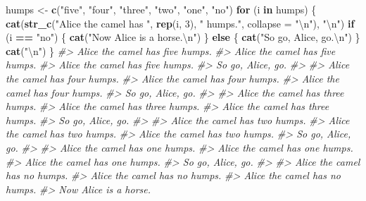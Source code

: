 \documentclass[]{book}
\newenvironment{Shaded}{\begin{snugshade}}{\end{snugshade}}
\newcommand{\CharTok}[1]{\textcolor[rgb]{0.31,0.60,0.02}{#1}}
\newcommand{\CommentTok}[1]{\textcolor[rgb]{0.56,0.35,0.01}{\textit{#1}}}
\newcommand{\ControlFlowTok}[1]{\textcolor[rgb]{0.13,0.29,0.53}{\textbf{#1}}}
\newcommand{\DataTypeTok}[1]{\textcolor[rgb]{0.13,0.29,0.53}{#1}}
\newcommand{\DecValTok}[1]{\textcolor[rgb]{0.00,0.00,0.81}{#1}}
\newcommand{\KeywordTok}[1]{\textcolor[rgb]{0.13,0.29,0.53}{\textbf{#1}}}
\newcommand{\NormalTok}[1]{#1}
\newcommand{\OperatorTok}[1]{\textcolor[rgb]{0.81,0.36,0.00}{\textbf{#1}}}
\newcommand{\StringTok}[1]{\textcolor[rgb]{0.31,0.60,0.02}{#1}}
\theoremstyle{definition}
\theoremstyle{definition}
\theoremstyle{definition}
\theoremstyle{remark}
\begin{document}
\begin{Shaded}
\begin{Highlighting}[]
\NormalTok{humps <-}\StringTok{ }\KeywordTok{c}\NormalTok{(}\StringTok{"five"}\NormalTok{, }\StringTok{"four"}\NormalTok{, }\StringTok{"three"}\NormalTok{, }\StringTok{"two"}\NormalTok{, }\StringTok{"one"}\NormalTok{, }\StringTok{"no"}\NormalTok{)}
\ControlFlowTok{for}\NormalTok{ (i }\ControlFlowTok{in}\NormalTok{ humps) \{}
  \KeywordTok{cat}\NormalTok{(}\KeywordTok{str_c}\NormalTok{(}\StringTok{"Alice the camel has "}\NormalTok{, }\KeywordTok{rep}\NormalTok{(i, }\DecValTok{3}\NormalTok{), }\StringTok{" humps."}\NormalTok{,}
             \DataTypeTok{collapse =} \StringTok{"}\CharTok{\textbackslash{}n}\StringTok{"}\NormalTok{), }\StringTok{"}\CharTok{\textbackslash{}n}\StringTok{"}\NormalTok{)}
  \ControlFlowTok{if}\NormalTok{ (i }\OperatorTok{==}\StringTok{ "no"}\NormalTok{) \{}
    \KeywordTok{cat}\NormalTok{(}\StringTok{"Now Alice is a horse.}\CharTok{\textbackslash{}n}\StringTok{"}\NormalTok{)}
\NormalTok{  \} }\ControlFlowTok{else}\NormalTok{ \{}
    \KeywordTok{cat}\NormalTok{(}\StringTok{"So go, Alice, go.}\CharTok{\textbackslash{}n}\StringTok{"}\NormalTok{)}
\NormalTok{  \}}
  \KeywordTok{cat}\NormalTok{(}\StringTok{"}\CharTok{\textbackslash{}n}\StringTok{"}\NormalTok{)}
\NormalTok{\}}
\CommentTok{#> Alice the camel has five humps.}
\CommentTok{#> Alice the camel has five humps.}
\CommentTok{#> Alice the camel has five humps. }
\CommentTok{#> So go, Alice, go.}
\CommentTok{#> }
\CommentTok{#> Alice the camel has four humps.}
\CommentTok{#> Alice the camel has four humps.}
\CommentTok{#> Alice the camel has four humps. }
\CommentTok{#> So go, Alice, go.}
\CommentTok{#> }
\CommentTok{#> Alice the camel has three humps.}
\CommentTok{#> Alice the camel has three humps.}
\CommentTok{#> Alice the camel has three humps. }
\CommentTok{#> So go, Alice, go.}
\CommentTok{#> }
\CommentTok{#> Alice the camel has two humps.}
\CommentTok{#> Alice the camel has two humps.}
\CommentTok{#> Alice the camel has two humps. }
\CommentTok{#> So go, Alice, go.}
\CommentTok{#> }
\CommentTok{#> Alice the camel has one humps.}
\CommentTok{#> Alice the camel has one humps.}
\CommentTok{#> Alice the camel has one humps. }
\CommentTok{#> So go, Alice, go.}
\CommentTok{#> }
\CommentTok{#> Alice the camel has no humps.}
\CommentTok{#> Alice the camel has no humps.}
\CommentTok{#> Alice the camel has no humps. }
\CommentTok{#> Now Alice is a horse.}
\end{Highlighting}
\end{Shaded}
\end{document}
